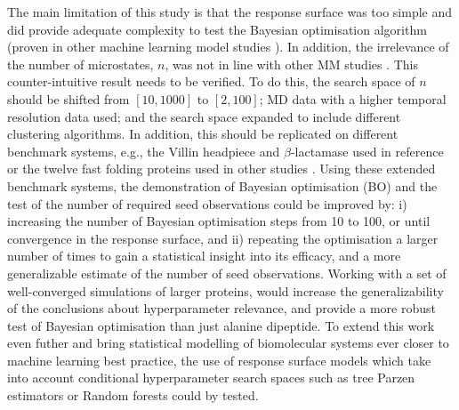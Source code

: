 The main limitation of this study is that the response surface was too simple and did provide adequate complexity to test the Bayesian optimisation algorithm (proven in other machine learning model studies \cite{bergstraAlgorithmsHyperParameterOptimizationa,bergstrajamesbergstraRandomSearchHyperParameter2012}).  In addition, the irrelevance of the number of microstates, $n$, was not in line with other MM studies \cite{mcgibbonStatisticalModelSelection2014a,wuVariationalApproachLearning2020c,mcgibbonVariationalCrossvalidationSlow2015}. This counter-intuitive result needs to be verified. To do this, the search space of $n$ should be shifted from $[10, 1000]$ to $[2, 100]$; MD data with a higher temporal resolution data used; and the search space expanded to include different clustering algorithms.  In addition, this should be replicated on different benchmark systems, e.g., the Villin headpiece and $\beta$-lactamase used in reference \cite{bowmanQuantitativeComparisonAlternative2013} or the twelve fast folding proteins \cite{lindorff-larsenHowFastFoldingProteins2011a} used in other studies \cite{husicOptimizedParameterSelection2016, schererPyEMMASoftwarePackage2015a, husicWardClusteringImproves2017a}. Using these extended benchmark systems, the demonstration of Bayesian optimisation (BO) and the test of the number of required seed observations could be improved by: i) increasing the number of Bayesian optimisation steps from \num{10} to \num{100}, or until convergence in the response surface, and ii) repeating the optimisation a larger number of times to gain a statistical insight into its efficacy, and a more generalizable estimate of the number of seed observations. Working with a set of well-converged simulations of larger proteins, would increase the generalizability of the conclusions about hyperparameter relevance, and provide a more robust test of Bayesian optimisation than just alanine dipeptide.  To extend this work even futher and bring statistical modelling of biomolecular systems ever closer to machine learning best practice, the use of response surface models which take into account conditional hyperparameter search spaces such as tree Parzen estimators or Random forests could by tested.


